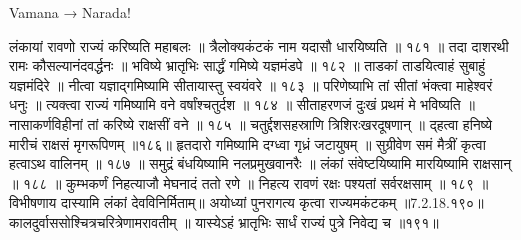 Vamana → Narada!

लंकायां रावणो राज्यं करिष्यति महाबलः ॥
त्रैलोक्यकंटकं नाम यदासौ धारयिष्यति ॥ १८१ ॥
तदा दाशरथी रामः कौसल्यानंदवर्द्धनः ॥
भविष्ये भ्रातृभिः सार्द्धं गमिष्ये यज्ञमंडपे ॥ १८२ ॥
ताडकां ताडयित्वाहं सुबाहुं यज्ञमंदिरे ॥
नीत्वा यज्ञाद्गमिष्यामि सीतायास्तु स्वयंवरे ॥ १८३ ॥
परिणेष्याभि तां सीतां भंक्त्वा माहेश्वरं धनुः ॥
त्यक्त्वा राज्यं गमिष्यामि वने वर्षांश्चतुर्दश ॥ १८४ ॥
सीताहरणजं दुःखं प्रथमं मे भविष्यति ॥
नासाकर्णविहीनां तां करिष्ये राक्षसीं वने ॥ १८५ ॥
चतुर्द्दशसहस्राणि त्रिशिरःखरदूषणान् ॥
द्हत्वा हनिष्ये मारीचं राक्षसं मृगरूपिणम् ॥१८६॥
हृतदारो गमिष्यामि दग्ध्वा गृध्रं जटायुषम् ॥
सुग्रीवेण समं मैत्रीं कृत्वा हत्वाऽथ वालिनम् ॥ १८७ ॥
समुद्रं बंधयिष्यामि नलप्रमुखवानरैः ॥
लंकां संवेष्टयिष्यामि मारयिष्यामि राक्षसान् ॥ १८८ ॥
कुम्भकर्णं निहत्याजौ मेघनादं ततो रणे ॥
निहत्य रावणं रक्षः पश्यतां सर्वरक्षसाम् ॥ १८९ ॥
विभीषणाय दास्यामि लंकां देवविनिर्मिताम्॥
अयोध्यां पुनरागत्य कृत्वा राज्यमकंटकम् ॥7.2.18.१९०॥
कालदुर्वाससोश्चित्रचरित्रेणामरावतीम् ॥
यास्येऽहं भ्रातृभिः सार्धं राज्यं पुत्रे निवेद्य च ॥१९१॥